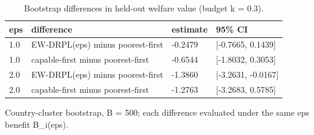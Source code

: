 \begin{table}[htbp]
\centering
\caption{Bootstrap differences in held-out welfare value (budget k = 0.3).}
\label{tab:agri_diff}
\begin{tabular}{llll}
\toprule
eps & difference & estimate & 95\% CI \\
\midrule
1.0 & EW-DRPL(eps) minus poorest-first & -0.2479 & [-0.7665, 0.1439] \\
1.0 & capable-first minus poorest-first & -0.6544 & [-1.8032, 0.3053] \\
2.0 & EW-DRPL(eps) minus poorest-first & -1.3860 & [-3.2631, -0.0167] \\
2.0 & capable-first minus poorest-first & -1.2763 & [-3.2683, 0.5785] \\
\bottomrule
\end{tabular}
\par\smallskip\footnotesize Country-cluster bootstrap, B = 500; each difference evaluated under the same eps benefit B\_i(eps).
\end{table}
